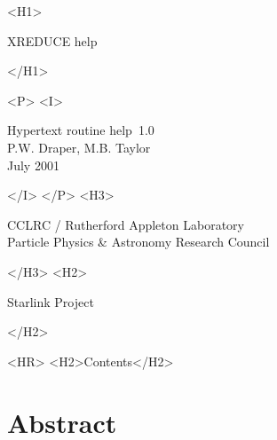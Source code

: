 \documentclass[11pt]{article}
\newcommand{\stardoccategory}  {Hypertext routine help}
\newcommand{\stardocnumber}    {1.0}
\newcommand{\stardocauthors}   {P.W. Draper, M.B. Taylor}
\newcommand{\stardocdate}      {July 2001}
\newcommand{\stardoctitle}     {XREDUCE help}
\newcommand{\htmladdnormallink}[2]{#1}
\newcommand{\htmladdimg}[1]{}
\newcommand{\htmlref}[2]{#1}
\newcommand{\htmladdtonavigation}[1]{}
\newcommand{\xlabel}[1]{}
\newcommand{\latexonlytoc}[0]{\tableofcontents}
\begin{document}
\begin{htmlonly}
   \xlabel{}
   \begin{rawhtml} <H1> \end{rawhtml}
      \stardoctitle
   \begin{rawhtml} </H1> \end{rawhtml}


   \begin{rawhtml} <P> <I> \end{rawhtml}
   \stardoccategory\ \stardocnumber \\
   \stardocauthors \\
   \stardocdate
   \begin{rawhtml} </I> </P> <H3> \end{rawhtml}
      \htmladdnormallink{CCLRC}{http://www.cclrc.ac.uk} /
      \htmladdnormallink{Rutherford Appleton Laboratory}
                        {http://www.cclrc.ac.uk/ral} \\
      Particle Physics \& Astronomy Research Council \\
   \begin{rawhtml} </H3> <H2> \end{rawhtml}
      \htmladdnormallink{Starlink Project}{http://star-www.rl.ac.uk/}
   \begin{rawhtml} </H2> \end{rawhtml}

  \label{stardoccontents}
  \begin{rawhtml}
    <HR>
    <H2>Contents</H2>
  \end{rawhtml}
  \renewcommand{\latexonlytoc}[0]{}
  \htmladdtonavigation{\htmlref{\htmladdimg{contents_motif.gif}}
        {stardoccontents}}

  \section{\xlabel{abstract}Abstract}

\end{htmlonly}
\end{document}
